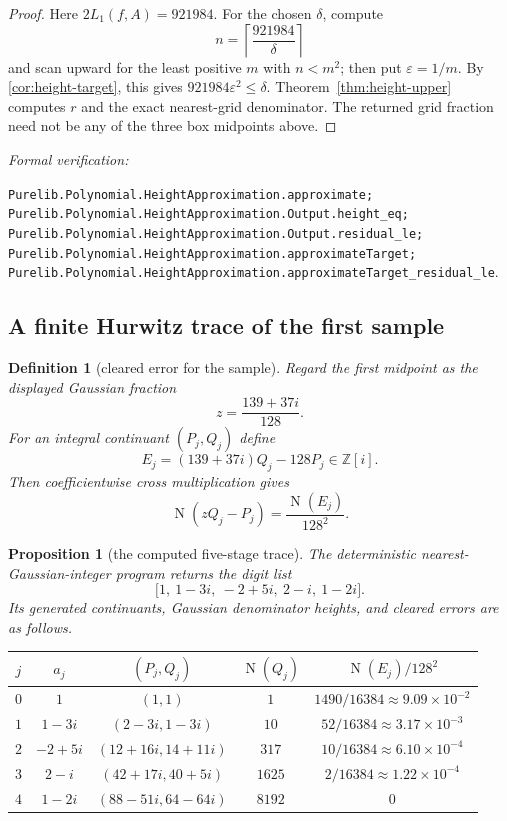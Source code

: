 \documentclass[11pt]{article}
\newtheorem{proposition}[proposition]{Proposition}
\newtheorem{definition}[definition]{Definition}
\newcommand{\Zi}{\mathbb{Z}[i]}
\newcommand{\Norm}[1]{\operatorname{N}\!\left(#1\right)}
\newcommand{\eps}{\varepsilon}
\newcommand{\leanref}[1]{\par\smallskip\noindent
  \emph{Formal verification:}\par\nobreak
  {\raggedright\nolinkurl{#1}.\par}}
\begin{document}
\begin{proof}
Here $2L_1(f,A)=921984$.  For the chosen $\delta$, compute
\[
 n=\left\lceil\frac{921984}{\delta}\right\rceil
\]
and scan upward for the least positive $m$ with $n<m^2$; then put
$\eps=1/m$.  By \cref{cor:height-target}, this gives
$921984\eps^2\le\delta$.  Theorem~\ref{thm:height-upper} computes $r$ and
the exact nearest-grid denominator.  The returned grid fraction need not be
any of the three box midpoints above.
\end{proof}

\leanref{Purelib.Polynomial.HeightApproximation.approximate;
Purelib.Polynomial.HeightApproximation.Output.height_eq;
Purelib.Polynomial.HeightApproximation.Output.residual_le;
Purelib.Polynomial.HeightApproximation.approximateTarget;
Purelib.Polynomial.HeightApproximation.approximateTarget_residual_le}

\subsection{A finite Hurwitz trace of the first sample}

\begin{definition}[cleared error for the sample]
\label{def:cubic-cleared-error}
Regard the first midpoint as the displayed Gaussian fraction
\[
                          z=\frac{139+37i}{128}.
\]
For an integral continuant $(P_j,Q_j)$ define
\[
          E_j=(139+37i)Q_j-128P_j\in\Zi.
\]
Then coefficientwise cross multiplication gives
\begin{equation}
\label{eq:cubic-cleared-error}
                  \Norm{zQ_j-P_j}=\frac{\Norm{E_j}}{128^2}.
\end{equation}
\end{definition}

\begin{proposition}[the computed five-stage trace]
\label{prop:cubic-hurwitz-trace}
The deterministic nearest-Gaussian-integer program returns the digit list
\[
              \bigl[1,\ 1-3i,\ -2+5i,\ 2-i,\ 1-2i\bigr].
\]
Its generated continuants, Gaussian denominator heights, and cleared errors
are as follows.

\begin{center}
\scriptsize
\begin{tabular}{@{}ccccc@{}}
\toprule
$j$ & $a_j$ & $(P_j,Q_j)$ & $\Norm{Q_j}$
    & $\Norm{E_j}/128^2$\\
\midrule
$0$ & $1$ & $(1,1)$ & $1$
    & $1490/16384\approx9.09\mathbin{\times}10^{-2}$\\
$1$ & $1-3i$ & $(2-3i,1-3i)$ & $10$
    & $52/16384\approx3.17\mathbin{\times}10^{-3}$\\
$2$ & $-2+5i$ & $(12+16i,14+11i)$ & $317$
    & $10/16384\approx6.10\mathbin{\times}10^{-4}$\\
$3$ & $2-i$ & $(42+17i,40+5i)$ & $1625$
    & $2/16384\approx1.22\mathbin{\times}10^{-4}$\\
$4$ & $1-2i$ & $(88-51i,64-64i)$ & $8192$
    & $0$\\
\bottomrule
\end{tabular}
\end{center}
\end{proposition}
\end{document}
